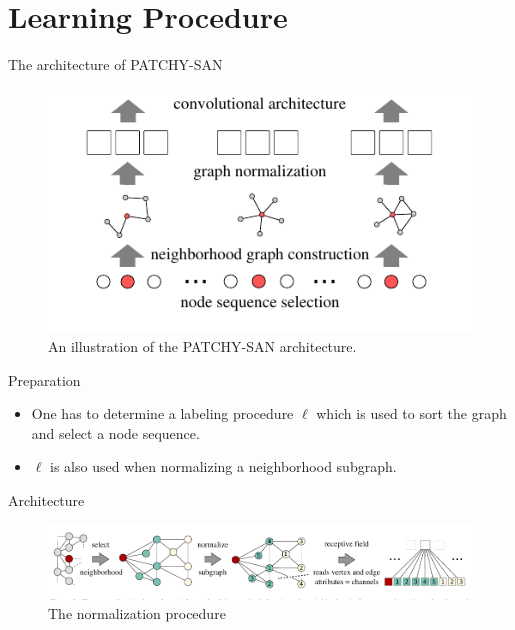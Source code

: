 \documentclass[dvipdfmx]{beamer}
\begin{document}
\section{Learning Procedure}

  \begin{frame}{The architecture of PATCHY-SAN}
    \begin{figure}[h]
      \centering
      \includegraphics[width=0.8\paperwidth]{img/Fig2.pdf}
      \caption{An illustration of the PATCHY-SAN architecture.}
    \end{figure}
  \end{frame}

  \begin{frame}{Preparation}
    \begin{itemize}
      \item One has to determine a \alert{labeling procedure $\ell$} which is used to sort the graph and
        select a node sequence.
      \item $\ell$ is also used when normalizing a neighborhood subgraph.
    \end{itemize}
  \end{frame}

  \begin{frame}{Architecture}
    \begin{figure}[h]
      \centering
      \includegraphics[width=0.9\paperwidth]{img/Fig3.pdf}
      \caption{The normalization procedure}
    \end{figure}
  \end{frame}
\end{document}
